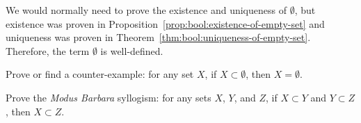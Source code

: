 We would normally need to prove the existence and uniqueness of
$\emptyset$, but existence was proven in
Proposition~\ref{prop:bool:existence-of-empty-set} and 
uniqueness was proven in Theorem~\ref{thm:bool:uniqueness-of-empty-set}.
Therefore, the term $\emptyset$ is well-defined.

\begin{xca}\label{xca:bool:subsets-of-empty-set-are-empty}
Prove or find a counter-example: for any set $X$, if $X\subset\emptyset$,
then $X=\emptyset$.
\end{xca}

\begin{xca}\label{xca:bool:modus-barbara}
Prove the \textit{Modus Barbara} syllogism: for any sets $X$, $Y$, and
$Z$, if $X\subset Y$ and $Y\subset Z$, then $X\subset Z$.
\end{xca}

